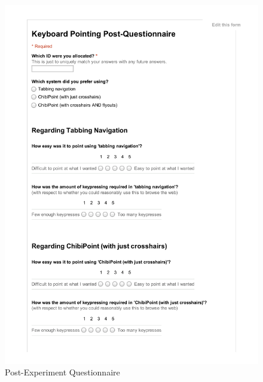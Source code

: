 \documentclass[11pt,openright,a4paper]{report}
\newcommand{\safefigheight}{\dimexpr\textheight-1.1\baselineskip-\abovecaptionskip-\belowcaptionskip\relax}
\begin{document}
\begin{figure}[ht]
\includegraphics[page=1,width=\textwidth,height=\safefigheight,keepaspectratio]{sheets/PostQuestionnaire.pdf}
\caption{Post-Experiment Questionnaire}
\label{fig:postquestionnaire}
\end{figure}
\end{document}
